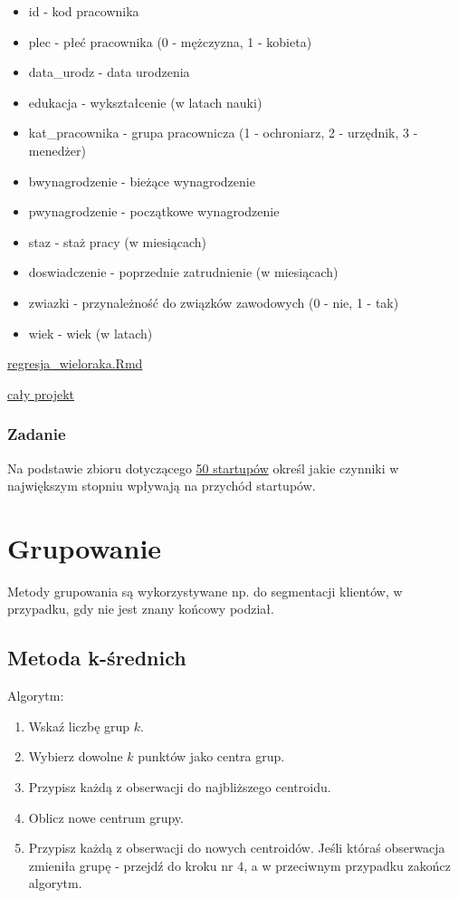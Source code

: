 \documentclass[]{book}
\providecommand{\tightlist}{%
  \setlength{\itemsep}{0pt}\setlength{\parskip}{0pt}}
\begin{document}
\begin{itemize}
\tightlist
\item
  id - kod pracownika
\item
  plec - płeć pracownika (0 - mężczyzna, 1 - kobieta)
\item
  data\_urodz - data urodzenia
\item
  edukacja - wykształcenie (w latach nauki)
\item
  kat\_pracownika - grupa pracownicza (1 - ochroniarz, 2 - urzędnik, 3 -
  menedżer)
\item
  bwynagrodzenie - bieżące wynagrodzenie
\item
  pwynagrodzenie - początkowe wynagrodzenie
\item
  staz - staż pracy (w miesiącach)
\item
  doswiadczenie - poprzednie zatrudnienie (w miesiącach)
\item
  zwiazki - przynależność do związków zawodowych (0 - nie, 1 - tak)
\item
  wiek - wiek (w latach)
\end{itemize}

\href{res/regresja_wieloraka.Rmd}{regresja\_wieloraka.Rmd}

\href{res/adr.zip}{cały projekt}

\subsection{Zadanie}\label{zadanie-1}

Na podstawie zbioru dotyczącego \href{data/50_Startups.csv}{50
startupów} określ jakie czynniki w największym stopniu wpływają na
przychód startupów.

\chapter{Grupowanie}\label{grupowanie}

Metody grupowania są wykorzystywane np. do segmentacji klientów, w
przypadku, gdy nie jest znany końcowy podział.

\section{Metoda k-średnich}\label{metoda-k-srednich}

Algorytm:

\begin{enumerate}
\def\labelenumi{\arabic{enumi}.}
\tightlist
\item
  Wskaź liczbę grup \(k\).
\item
  Wybierz dowolne \(k\) punktów jako centra grup.
\item
  Przypisz każdą z obserwacji do najbliższego centroidu.
\item
  Oblicz nowe centrum grupy.
\item
  Przypisz każdą z obserwacji do nowych centroidów. Jeśli któraś
  obserwacja zmieniła grupę - przejdź do kroku nr 4, a w przeciwnym
  przypadku zakończ algorytm.
\end{enumerate}
\end{document}
